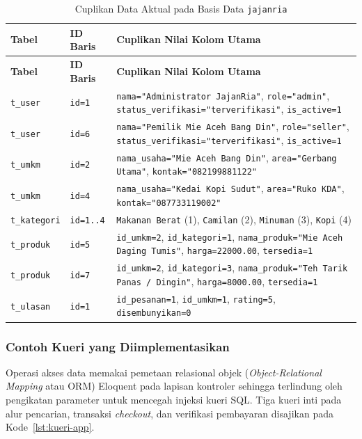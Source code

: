 \renewcommand{\arraystretch}{1.20}
\begin{longtable}{|L{2.2cm}|L{1.55cm}|L{\dimexpr\textwidth-2.2cm-1.55cm-6\arrayrulewidth\relax}|}
\caption{Cuplikan Data Aktual pada Basis Data \texttt{jajanria}}
\label{tab:contoh-data-db} \\
\hline
{}
\textbf{Tabel} & \textbf{ID Baris} & \textbf{Cuplikan Nilai Kolom Utama} \\
\hline
\endfirsthead
\hline
{}
\textbf{Tabel} & \textbf{ID Baris} & \textbf{Cuplikan Nilai Kolom Utama} \\
\hline
\endhead
\hline
\endfoot
\texttt{t\_user} & \texttt{id=1} & \texttt{nama="Administrator JajanRia"}, \texttt{role="admin"}, \texttt{status\_verifikasi="terverifikasi"}, \texttt{is\_active=1} \\
\hline
\texttt{t\_user} & \texttt{id=6} & \texttt{nama="Pemilik Mie Aceh Bang Din"}, \texttt{role="seller"}, \texttt{status\_verifikasi="terverifikasi"}, \texttt{is\_active=1} \\
\hline
\texttt{t\_umkm} & \texttt{id=2} & \texttt{nama\_usaha="Mie Aceh Bang Din"}, \texttt{area="Gerbang Utama"}, \texttt{kontak="082199881122"} \\
\hline
\texttt{t\_umkm} & \texttt{id=4} & \texttt{nama\_usaha="Kedai Kopi Sudut"}, \texttt{area="Ruko KDA"}, \texttt{kontak="087733119002"} \\
\hline
\texttt{t\_kategori} & \texttt{id=1..4} & \texttt{Makanan Berat} (1), \texttt{Camilan} (2), \texttt{Minuman} (3), \texttt{Kopi} (4) \\
\hline
\texttt{t\_produk} & \texttt{id=5} & \texttt{id\_umkm=2}, \texttt{id\_kategori=1}, \texttt{nama\_produk="Mie Aceh Daging Tumis"}, \texttt{harga=22000.00}, \texttt{tersedia=1} \\
\hline
\texttt{t\_produk} & \texttt{id=7} & \texttt{id\_umkm=2}, \texttt{id\_kategori=3}, \texttt{nama\_produk="Teh Tarik Panas / Dingin"}, \texttt{harga=8000.00}, \texttt{tersedia=1} \\
\hline
\texttt{t\_ulasan} & \texttt{id=1} & \texttt{id\_pesanan=1}, \texttt{id\_umkm=1}, \texttt{rating=5}, \texttt{disembunyikan=0} \\
\hline
\end{longtable}

\subsubsection{Contoh Kueri yang Diimplementasikan}
Operasi akses data memakai pemetaan relasional objek (\textit{Object-Relational Mapping} atau ORM) Eloquent pada lapisan kontroler sehingga terlindung oleh pengikatan parameter untuk mencegah injeksi kueri SQL. Tiga kueri inti pada alur pencarian, transaksi \textit{checkout}, dan verifikasi pembayaran disajikan pada Kode~\ref{lst:kueri-app}.

